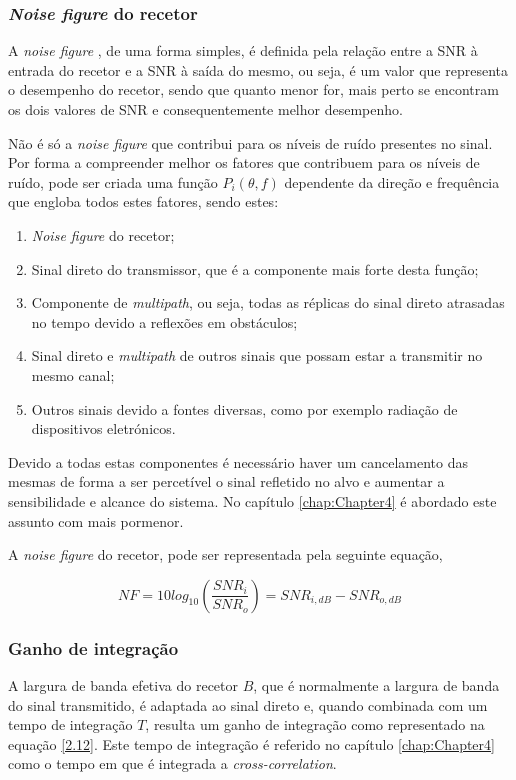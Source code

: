 \subsubsection*{\textit{Noise figure} do recetor}
A \textit{noise figure} , de uma forma simples, é definida pela relação entre a \gls{SNR} à entrada do recetor e a \gls{SNR} à saída do mesmo, ou seja, é um valor que representa o desempenho do recetor, sendo que quanto menor for, mais perto se encontram os dois valores de \gls{SNR} e consequentemente melhor desempenho.\par
Não é só a \textit{noise figure} que contribui para os níveis de ruído presentes no sinal. Por forma a compreender melhor os fatores que contribuem para os níveis de ruído, pode ser criada uma função $P_{i}(\theta ,f)$ dependente da direção e frequência que engloba todos estes fatores, sendo estes:
\begin{enumerate}
\item \textit{Noise figure} do recetor;
\item Sinal direto do transmissor, que é a componente mais forte desta função;
\item Componente de \textit{multipath}, ou seja, todas as réplicas do sinal direto atrasadas no tempo devido a reflexões em obstáculos;
\item Sinal direto e \textit{multipath} de outros sinais que possam estar a transmitir no mesmo canal;
\item Outros sinais devido a fontes diversas, como por exemplo radiação de dispositivos eletrónicos.
\end{enumerate}
Devido a todas estas componentes é necessário haver um cancelamento das mesmas de forma a ser percetível o sinal refletido no alvo e aumentar a sensibilidade e alcance do sistema. No capítulo \ref{chap:Chapter4} é abordado este assunto com mais pormenor.\par 

A \textit{noise figure} do recetor, pode ser representada pela seguinte equação,

\begin{equation} \label{2.11}
NF=10log_{10}\left( \dfrac{SNR_{i}}{SNR_{o}}\right)=SNR_{i,dB}-SNR_{o,dB}
\end{equation}

\subsubsection*{Ganho de integração}
A largura de banda efetiva do recetor $B$, que é normalmente a largura de banda do sinal transmitido, é adaptada ao sinal direto e, quando combinada com um tempo de integração $T$, resulta um ganho de integração como representado na equação \ref{2.12}. Este tempo de integração é referido no capítulo \ref{chap:Chapter4} como o tempo em que é integrada a \textit{cross-correlation}.

